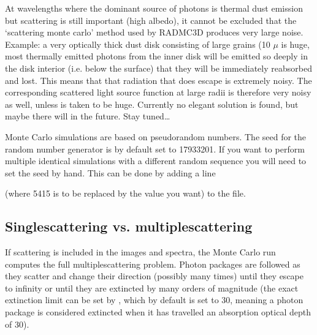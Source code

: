 \documentclass[letterpaper,10pt,english]{sphinxmanual}
\begin{document}
 At wavelengths where the dominant source of photons is thermal dust
emission but scattering is still important (high albedo), it cannot be excluded
that the ‘scattering monte carlo’ method used by RADMC\sphinxhyphen{}3D produces very large
noise. Example: a very optically thick dust disk consisting of large grains (10
\(\mu\) is
huge, most thermally emitted photons from the inner disk will be emitted so
deeply in the disk interior (i.e. below the surface) that they will be
immediately reabsorbed and lost. This means that that radiation that does escape
is extremely noisy. The corresponding scattered light source function at large
radii is therefore very noisy as well, unless  is taken to be
huge. Currently no elegant solution is found, but maybe there will in the
future. Stay tuned…

 Monte Carlo simulations are based on pseudo\sphinxhyphen{}random numbers.
The seed for the random number generator is by default set to \sphinxhyphen{}17933201.
If you want to perform multiple identical simulations with a different
random sequence you will need to set the seed by hand. This can be
done by adding a line

\begin{sphinxVerbatim}[commandchars=\\\{\}]
  
\end{sphinxVerbatim}

(where \sphinxhyphen{}5415 is to be replaced by the value you want) to the  file.


\subsection{Single\sphinxhyphen{}scattering vs. multiple\sphinxhyphen{}scattering}
\label{\detokenize{dustradtrans:single-scattering-vs-multiple-scattering}}\label{\detokenize{dustradtrans:sec-single-multiple-scattering}}
If scattering is included in the images and spectra, the Monte Carlo run
computes the full multiple\sphinxhyphen{}scattering problem. Photon packages are followed as
they scatter and change their direction (possibly many times) until they escape
to infinity or until they are extincted by many orders of magnitude (the exact
extinction limit can be set by , which by default is set to
30, meaning a photon package is considered extincted when it has travelled an
absorption optical depth of 30).
\end{document}
